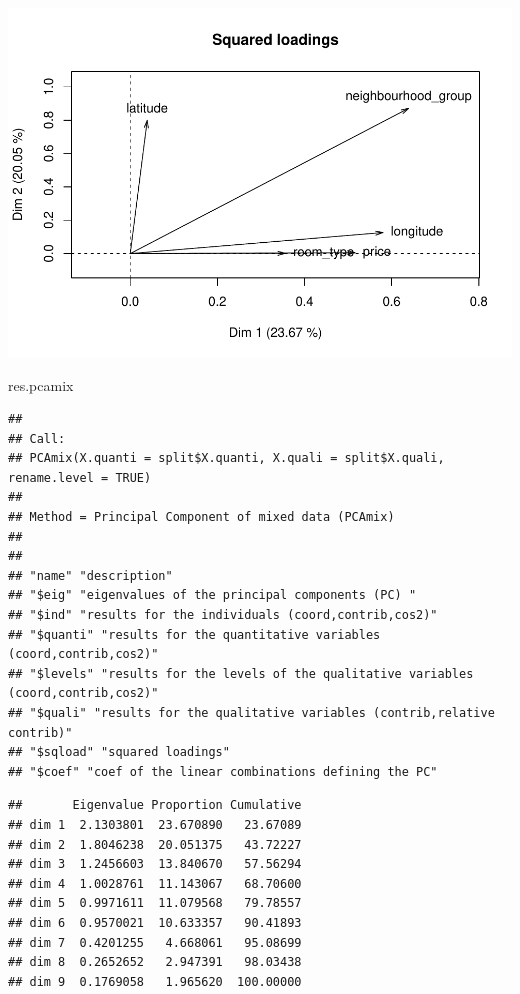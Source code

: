 \documentclass[
]{article}
\newenvironment{Shaded}{\begin{snugshade}}{\end{snugshade}}
\newcommand{\CommentTok}[1]{\textcolor[rgb]{0.56,0.35,0.01}{\textit{#1}}}
\newcommand{\NormalTok}[1]{#1}
\newcommand{\OperatorTok}[1]{\textcolor[rgb]{0.81,0.36,0.00}{\textbf{#1}}}
\begin{document}
\includegraphics{project-code_files/figure-latex/unnamed-chunk-29-4.pdf}

\begin{Shaded}
\begin{Highlighting}[]
\NormalTok{res.pcamix}
\end{Highlighting}
\end{Shaded}

\begin{verbatim}
## 
## Call:
## PCAmix(X.quanti = split$X.quanti, X.quali = split$X.quali, rename.level = TRUE)
## 
## Method = Principal Component of mixed data (PCAmix)
## 
## 
## "name" "description"
## "$eig" "eigenvalues of the principal components (PC) "
## "$ind" "results for the individuals (coord,contrib,cos2)"
## "$quanti" "results for the quantitative variables (coord,contrib,cos2)"
## "$levels" "results for the levels of the qualitative variables (coord,contrib,cos2)"
## "$quali" "results for the qualitative variables (contrib,relative contrib)"
## "$sqload" "squared loadings"
## "$coef" "coef of the linear combinations defining the PC"
\end{verbatim}

\begin{Shaded}
\end{Shaded}

\begin{verbatim}
##       Eigenvalue Proportion Cumulative
## dim 1  2.1303801  23.670890   23.67089
## dim 2  1.8046238  20.051375   43.72227
## dim 3  1.2456603  13.840670   57.56294
## dim 4  1.0028761  11.143067   68.70600
## dim 5  0.9971611  11.079568   79.78557
## dim 6  0.9570021  10.633357   90.41893
## dim 7  0.4201255   4.668061   95.08699
## dim 8  0.2652652   2.947391   98.03438
## dim 9  0.1769058   1.965620  100.00000
\end{verbatim}
\end{document}

